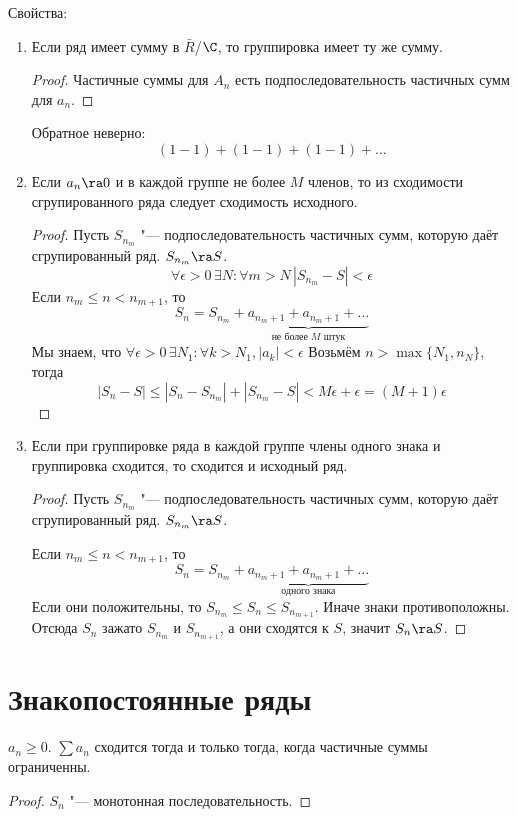 Свойства:
\begin{enumerate}
\item
	Если ряд имеет сумму в $\bar R$/$\C$, то группировка имеет ту же сумму.
	\begin{proof}
		Частичные суммы для $A_n$ есть подпоследовательность частичных сумм для $a_n$.
	\end{proof}
	\begin{Rem}
		Обратное неверно:
		\[ (1 - 1) + (1 - 1) + (1 - 1) + \dots \]
	\end{Rem}

\item
	Если $a_n \ra 0$ и в каждой группе не более $M$ членов, то из сходимости сгрупированного ряда следует сходимость исходного.
	\begin{proof}
		Пусть $S_{n_m}$ "--- подпоследовательность частичных сумм, которую даёт сгрупированный ряд.
		$S_{n_m} \ra S$.
		\[
			\forall \epsilon>0\, \exists N\colon \forall m > N\, |S_{n_m} - S| < \epsilon
		\]
		Если $n_m \le n < n_{m+1}$, то
		\[ S_n = S_{n_m} + \underbrace{a_{n_m+1} + a_{n_m+1} + \dots}_{\text{не более $M$ штук}} \]
		Мы знаем, что $\forall \epsilon > 0\, \exists N_1 \colon \forall k > N_1, |a_k| < \epsilon$
		Возьмём $n > \max \{N_1, n_N\}$, тогда
		\[ |S_n - S| \le |S_n - S_{n_m}| + |S_{n_m} - S| < M\epsilon + \epsilon = (M+1)\epsilon \]
	\end{proof}

\item
	Если при группировке ряда в каждой группе члены одного знака и группировка сходится, то сходится и исходный ряд.
	\begin{proof}
		Пусть $S_{n_m}$ "--- подпоследовательность частичных сумм, которую даёт сгрупированный ряд.
		$S_{n_m} \ra S$.

		Если $n_m \le n < n_{m+1}$, то
		\[ S_n = S_{n_m} + \underbrace{a_{n_m+1} + a_{n_m+1} + \dots}_{\text{одного знака}} \]
		Если они положительны, то $S_{n_m} \le S_n \le S_{n_{m+1}}$.
		Иначе знаки противоположны.
		Отсюда $S_n$ зажато $S_{n_m}$ и $S_{n_{m+1}}$, а они сходятся к $S$, значит $S_n \ra S$.
	\end{proof}
\end{enumerate}

\section{Знакопостоянные ряды}

\begin{theorem}
	$a_n \ge 0$.
	$\sum a_n$ сходится тогда и только тогда, когда частичные суммы ограниченны.
\end{theorem}
\begin{proof}
	$S_n$ "--- монотонная последовательность.
\end{proof}

